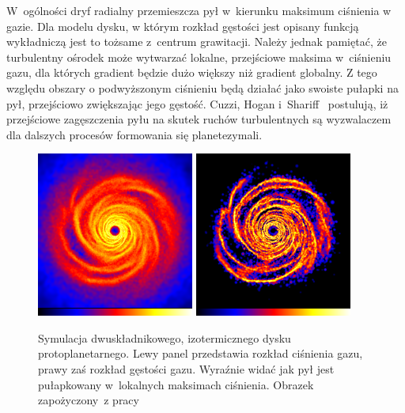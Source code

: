 \par W~ogólności dryf radialny przemieszcza pył w~kierunku maksimum ciśnienia w
gazie. Dla modelu dysku, w którym rozkład gęstości jest opisany funkcją
wykładniczą jest to tożsame z~centrum grawitacji. Należy jednak pamiętać, że
turbulentny ośrodek może wytwarzać lokalne, przejściowe maksima w~ciśnieniu
gazu, dla których gradient będzie dużo większy niż gradient globalny. Z tego
względu obszary o podwyższonym ciśnieniu będą działać jako swoiste pułapki na
pył, przejściowo zwiększając jego gęstość.  Cuzzi, Hogan i~Shariff~\citep{CHS08}
postulują, iż przejściowe zagęszczenia pyłu na skutek ruchów turbulentnych są
wyzwalaczem dla dalszych procesów formowania się planetezymali.
%
\begin{figure}
   \centering
   \includegraphics[width=0.46\textwidth]{figures/chap1_gasdisk.png}
   \includegraphics[width=0.46\textwidth]{figures/chap1_dustdisk.png}
   \caption{Symulacja dwuskładnikowego, izotermicznego dysku
      pro\-to\-pla\-ne\-tar\-ne\-go.
      Lewy panel przedstawia rozkład ciśnienia gazu, prawy zaś rozkład gęstości
      gazu. Wy\-raź\-nie widać jak pył jest pułapkowany w~lokalnych maksimach
      ciśnienia. Obrazek za\-po\-ży\-czo\-ny~z pracy~\cite{RLP2006}}
   \label{fig:chap1_trap}
\end{figure}

